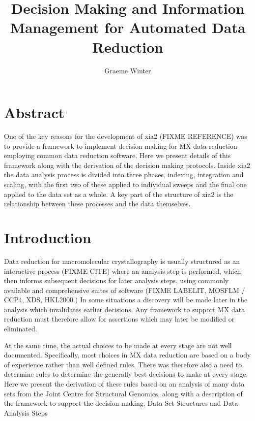 \documentclass[a4paper, 11pt]{article}
\title{Decision Making and Information Management for Automated Data Reduction}
\author{Graeme Winter}
\begin{document}
\maketitle

\section{Abstract}

One of the key reasons for the development of xia2 (FIXME REFERENCE) was to provide a framework to implement decision making for MX data reduction employing common data reduction software. Here we present details of this framework along with the derivation of the decision making protocols. Inside xia2 the data analysis process is divided into three phases, indexing, integration and scaling, with the first two of these applied to individual sweeps and the final one applied to the data set as a whole. A key part of the structure of xia2 is the relationship between these processes and the data themselves.

\section{Introduction}

Data reduction for macromolecular crystallography is usually structured as an interactive process (FIXME CITE) where an analysis step is performed, which then informs subsequent decisions for later analysis steps, using commonly available and comprehensive suites of software (FIXME LABELIT, MOSFLM / CCP4, XDS, HKL2000.) In some situations a discovery will be made later in the analysis which invalidates earlier decisions. Any framework to support MX data reduction must therefore allow for assertions which may later be modified or eliminated. 

At the same time, the actual choices to be made at every stage are not well documented. Specifically, most choices in MX data reduction are based on a body of experience rather than well defined rules. There was therefore also a need to determine rules to determine the generally best decisions to make at every stage. Here we present the derivation of these rules based on an analysis of many data sets from the Joint Centre for Structural Genomics, along with a description of the framework to support the decision making.
Data Set Structures and Data Analysis Steps
\end{document}
